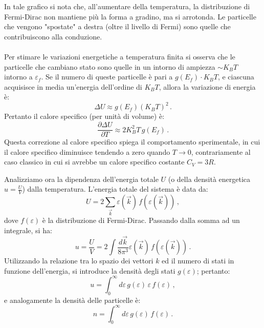 In tale grafico si nota che, all'aumentare della temperatura, la distribuzione di Fermi-Dirac non mantiene più la forma a gradino, ma si arrotonda. Le particelle che vengono "spostate" a destra (oltre il livello di Fermi) sono quelle che contribuiscono alla conduzione.\\\\
Per stimare le variazioni energetiche a temperatura finita si osserva che le particelle che cambiano stato sono quelle in un intorno di ampiezza $\sim K_B T$ intorno a $\varepsilon_f$. Se il numero di queste particelle è pari a $g(E_f) \cdot K_B T$, e ciascuna acquisisce in media un'energia dell'ordine di $K_B T$, allora la variazione di energia è:
\[
\Delta U \approx g(E_f) (K_B T)^2\,.
\]
Pertanto il calore specifico (per unità di volume) è:
\begin{equation}
	\frac{\partial \Delta U}{\partial T} \approx 2 K_B^2 T\,g(E_f)\,.
	\label{eqn:Cv_explicit}
\end{equation}
Questa correzione al calore specifico spiega il comportamento sperimentale, in cui il calore specifico diminuisce tendendo a zero quando $T\to 0$, contrariamente al caso classico in cui si avrebbe un calore specifico costante $C_V = 3R$.

\bigskip
\noindent
Analizziamo ora la dipendenza dell'energia totale $U$ (o della densità energetica $u=\frac{U}{V}$) dalla temperatura. L'energia totale del sistema è data da:
\[
U= 2 \sum_{\vec{k}} \varepsilon(\vec{k})\, f(\varepsilon(\vec{k}))\,,
\]
dove $f(\varepsilon)$ è la distribuzione di Fermi-Dirac. Passando dalla somma ad un integrale, si ha:
\[
u= \frac{U}{V}= 2\int \frac{d\vec{k}}{8\pi^3} \varepsilon(\vec{k})\, f(\varepsilon(\vec{k}))\,.
\]
Utilizzando la relazione tra lo spazio dei vettori $k$ ed il numero di stati in funzione dell'energia, si introduce la densità degli stati $g(\varepsilon)$; pertanto:
\[
u= \int_{0}^{\infty} d\varepsilon\, g(\varepsilon)\, \varepsilon\, f(\varepsilon)\,,
\]
e analogamente la densità delle particelle è:
\[
n= \int_{0}^{\infty} d\varepsilon\, g(\varepsilon)\, f(\varepsilon)\,.
\]

